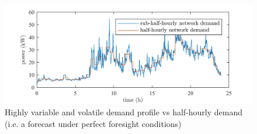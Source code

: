 \begin{figure}\centering
	\includegraphics{_chapter1/fig/sub-half-horuly-demand-comparison}
	\caption{Highly variable and volatile demand profile vs half-hourly demand (i.e. a forecast under perfect foresight conditions)}
	\label{ch1:fig:sub-half-horuly-demand-comparison}
\end{figure}